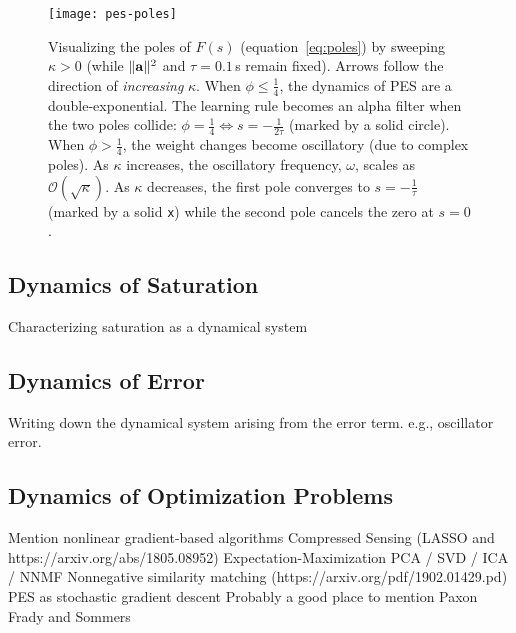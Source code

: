 \begin{figure}
\centering
\texttt{[image: pes-poles]}
\caption{ \label{fig:pes-poles}
  Visualizing the poles of $F(s)$ (equation~\ref{eq:poles}) by sweeping $\kappa > 0$ (while $\| \mathbf{a} \|^2$  and $\tau = 0.1\,$s remain fixed).
  Arrows follow the direction of \emph{increasing} $\kappa$.
  When $\phi \le \frac{1}{4}$, the dynamics of PES are a double-exponential.
  The learning rule becomes an alpha filter when the two poles collide: $\phi = \frac{1}{4} \iff s = -\frac{1}{2\tau}$ (marked by a solid circle).
  When $\phi > \frac{1}{4}$, the weight changes become oscillatory (due to complex poles).
  As $\kappa$ increases, the oscillatory frequency, $\omega$, scales as $\mathcal{O}\left(\sqrt{\kappa}\right)$.
  As $\kappa$ decreases, the first pole converges to $s = -\frac{1}{\tau}$ (marked by a solid \texttt{x}) while the second pole cancels the zero at $s = 0$. %
}
\end{figure}

\subsection{Dynamics of Saturation}

Characterizing saturation as a dynamical system

\subsection{Dynamics of Error}

Writing down the dynamical system arising from the error term. e.g., oscillator error.

\subsection{Dynamics of Optimization Problems}

Mention nonlinear gradient-based algorithms 
 Compressed Sensing (LASSO and https://arxiv.org/abs/1805.08952)
 Expectation-Maximization
 PCA / SVD / ICA / NNMF
 Nonnegative similarity matching (https://arxiv.org/pdf/1902.01429.pd)
 PES as stochastic gradient descent
Probably a good place to mention Paxon Frady and Sommers
